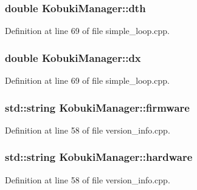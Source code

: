 \subsubsection[{dth}]{\setlength{\rightskip}{0pt plus 5cm}double {\bf \-Kobuki\-Manager\-::dth}\hspace{0.3cm}{\ttfamily  [private]}}\label{classKobukiManager_aae56a5aba9c5860a6a4c0825838578e5}


\-Definition at line 69 of file simple\-\_\-loop.\-cpp.

\subsubsection[{dx}]{\setlength{\rightskip}{0pt plus 5cm}double {\bf \-Kobuki\-Manager\-::dx}\hspace{0.3cm}{\ttfamily  [private]}}\label{classKobukiManager_ae27c93049cd6d6a5b8ab94ee16a5e1fa}


\-Definition at line 69 of file simple\-\_\-loop.\-cpp.

\subsubsection[{firmware}]{\setlength{\rightskip}{0pt plus 5cm}std\-::string {\bf \-Kobuki\-Manager\-::firmware}\hspace{0.3cm}{\ttfamily  [private]}}\label{classKobukiManager_add3c2b016571059102d52edcbf8b63ac}


\-Definition at line 58 of file version\-\_\-info.\-cpp.

\subsubsection[{hardware}]{\setlength{\rightskip}{0pt plus 5cm}std\-::string {\bf \-Kobuki\-Manager\-::hardware}\hspace{0.3cm}{\ttfamily  [private]}}\label{classKobukiManager_a36968fe38609a51c9949e7c6aada04f1}


\-Definition at line 58 of file version\-\_\-info.\-cpp.

